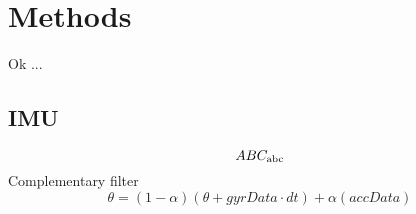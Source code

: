 \chapter{Methods}
\label{ch:Methods}
Ok
...
\section{IMU}
\begin{equation}
	ABC_\mathrm{abc}
\end{equation}
Complementary filter
\begin{equation}
	\theta = (1-\alpha)(\theta + gyrData\cdot dt) + \alpha(accData)
\end{equation}
